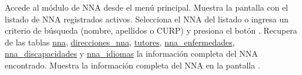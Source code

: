 \begin{UCtrayectoria}
	\UCpaso[\UCactor] Accede al módulo de NNA desde el menú principal.
	\UCpaso Muestra la pantalla  con el listado de NNA registrados activos. 
	\UCpaso[\UCactor] \label{CU-14.busca} Selecciona el NNA del listado o ingresa un criterio de búsqueda (nombre, apellidos o CURP) y presiona el botón . 
	\UCpaso Recupera de las tablas \hyperlink{NNA}{nna}, \hyperlink{Direcciones}{direcciones\_nna}, \hyperlink{Tutores}{tutores}, \hyperlink{PersonasEnfermedades}{nna\_enfermedades}, \hyperlink{NNADiscapacidades}{nna\_discapacidades} y \hyperlink{PersonasIdiomas}{nna\_idiomas} la información completa del NNA encontrado.
	\UCpaso Muestra la información completa del NNA en la pantalla .
\end{UCtrayectoria}


